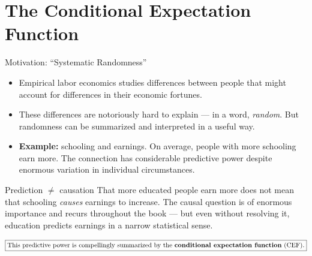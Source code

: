 \documentclass[aspectratio=169,11pt]{beamer}
\begin{document}

\section{The Conditional Expectation Function}

\begin{frame}{Motivation: ``Systematic Randomness''}
\small

\begin{itemize}
    \item Empirical labor economics studies differences between people that
    might account for differences in their economic fortunes.
    \item These differences are notoriously hard to explain --- in a word,
    \emph{random}. But randomness can be summarized and interpreted in a
    useful way.
    \item \textbf{Example:} schooling and earnings. On average, people with
    more schooling earn more. The connection has considerable predictive
    power despite enormous variation in individual circumstances.
\end{itemize}

\begin{alertblock}{Prediction $\neq$ causation}
That more educated people earn more does not mean that schooling
\emph{causes} earnings to increase. The causal question is of enormous
importance and recurs throughout the book --- but even without resolving it,
education predicts earnings in a narrow statistical sense.
\end{alertblock}

\medskip

\[
\boxed{
\text{This predictive power is compellingly summarized by the
\textbf{conditional expectation function} (CEF).}
}
\]

\end{frame}
\end{document}
